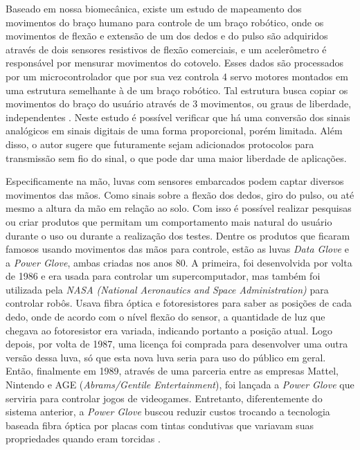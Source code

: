 \documentclass[
	12pt,				%
	openright,			%
	oneside,			%
	a4paper,			%
	english,			%
	brazil				%
	]{abntex2}
\begin{document}
		Baseado em nossa biomecânica, existe um estudo de mapeamento dos movimentos do braço humano para controle de um braço robótico, onde os movimentos de flexão e extensão de um dos dedos e do pulso são adquiridos através de dois sensores resistivos de flexão comerciais, e um acelerômetro é responsável por mensurar movimentos do cotovelo. Esses dados são processados por um microcontrolador que por sua vez controla 4 servo motores montados em uma estrutura semelhante à de um braço robótico. Tal estrutura busca copiar os movimentos do braço do usuário através de 3 movimentos, ou graus de liberdade, independentes \cite{syed2012armcontroller}. Neste estudo é possível verificar que há uma conversão dos sinais analógicos em sinais digitais de uma forma proporcional, porém limitada. Além disso, o autor sugere que futuramente sejam adicionados protocolos para transmissão sem fio do sinal, o que pode dar uma maior liberdade de aplicações.
		
		Especificamente na mão, luvas com sensores embarcados podem captar diversos movimentos das mãos. Como sinais sobre a flexão dos dedos, giro do pulso, ou até mesmo a altura da mão em relação ao solo. Com isso é possível realizar pesquisas ou criar produtos que permitam um comportamento mais natural do usuário durante o uso ou durante a realização dos testes. Dentre os produtos que ficaram famosos usando movimentos das mãos para controle, estão as luvas \textit{Data Glove} e a \textit{Power Glove}, ambas criadas nos anos 80. A primeira, foi desenvolvida por volta de 1986 e era usada para controlar um supercomputador, mas também foi utilizada pela \textit{NASA (National Aeronautics and Space Administration)} para controlar robôs. Usava fibra óptica e fotoresistores para saber as posições de cada dedo, onde de acordo com o nível flexão do sensor, a quantidade de luz que chegava ao fotoresistor era variada, indicando portanto a posição atual. Logo depois, por volta de 1987, uma licença foi comprada para desenvolver uma outra versão dessa luva, só que esta nova luva seria para uso do público em geral. Então, finalmente em 1989, através de uma parceria entre as empresas Mattel, Nintendo e AGE (\textit{Abrams/Gentile Entertainment}), foi lançada a \textit{Power Glove} que serviria para controlar jogos de videogames. Entretanto, diferentemente do sistema anterior, a \textit{Power Glove} buscou reduzir custos trocando a tecnologia baseada fibra óptica por placas com tintas condutivas que variavam suas propriedades quando eram torcidas \cite{dana1989powerglove}. 
	
\end{document}
